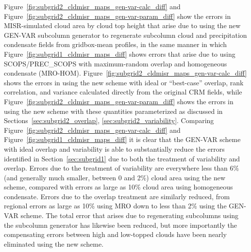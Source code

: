 Figure~\ref{fig:subgrid2_cldmisr_maps_gen-var-calc_diff} and
Figure~\ref{fig:subgrid2_cldmisr_maps_gen-var-param_diff} show the
errors in MISR-simulated cloud area by cloud top height that arise due
to using the new GEN-VAR subcolumn generator to regenerate subcolumn
cloud and precipitation condensate fields from gridbox-mean profiles, in
the same manner in which Figure~\ref{fig:subgrid1_cldmisr_maps_diff}
shows errors that arise due to using SCOPS/PREC\_SCOPS with
maximum-random overlap and homogeneous condensate (MRO-HOM).
Figure~\ref{fig:subgrid2_cldmisr_maps_gen-var-calc_diff} shows the
errors in using the new scheme with ideal or ``best-case'' overlap, rank
correlation, and variance calculated directly from the original CRM
fields, while Figure~\ref{fig:subgrid2_cldmisr_maps_gen-var-param_diff}
shows the errors in using the new scheme with these quantities
parameterized as discussed in
Sections~\ref{sec:subgrid2_overlap}, \ref{sec:subgrid2_variability}.
Comparing Figure~\ref{fig:subgrid2_cldmisr_maps_gen-var-calc_diff} and
Figure~\ref{fig:subgrid1_cldmisr_maps_diff} it is clear that the GEN-VAR
scheme with ideal overlap and variability is able to substantially
reduce the errors identified in Section~\ref{sec:subgrid1} due to both
the treatment of variability and overlap. Errors due to the treatment of
variability are everywhere less than 6\% (and generally much smaller,
between 0 and 2\%) cloud area using the new scheme, compared with errors
as large as 10\% cloud area using homogeneous condensate. Errors due to
the overlap treatment are similarly reduced, from regional errors as
large as 10\% using MRO down to less than 2\% using the GEN-VAR scheme.
The total error that arises due to regenerating subcolumns using the
subcolumn generator has likewise been reduced, but more importantly the
compensating errors between high and low-topped clouds have been nearly
eliminated using the new scheme.

